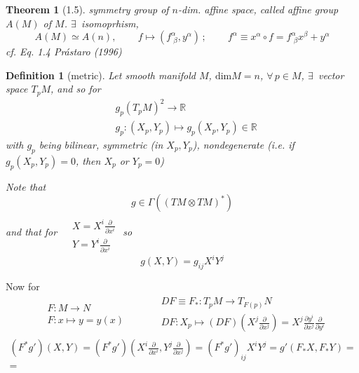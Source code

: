 \documentclass[10pt]{amsart}
\newtheorem{theorem}{Theorem}
\newtheorem{definition}{Definition}
\begin{document}
\begin{multicols*}{2}
\begin{theorem}[1.5] symmetry group of $n$-dim. affine space, called affine group $A(M)$ of $M$.  $\exists \, $ isomoprhism,
  \begin{equation}
    A(M) \simeq A(n), \qquad \, f\mapsto (f^{\alpha}_{ \, \, \beta} , y^{\alpha}) \, ; \qquad \, f^{\alpha} \equiv x^{\alpha} \circ f = f^{\alpha}_{ \, \, \beta} x^{\beta} + y^{\alpha}
  \end{equation}
cf. Eq. 1.4 Pr\'{a}staro (1996) \cite{Pras1996}
  \end{theorem}

\begin{definition}[metric]
	Let smooth manifold $M$, $\text{dim}M = n$, $\forall \, p \in M$, $\exists \, $ vector space $T_pM$, and so for 
	\begin{equation}
	\begin{aligned}
	& g_p (T_pM)^2 \to \mathbb{R} \\
	& g_p : (X_p,Y_p) \mapsto g_p(X_p,Y_p) \in \mathbb{R}
	\end{aligned}
	\end{equation}
	with $g_p$ being bilinear, symmetric (in $X_p,Y_p$), nondegenerate (i.e. if $g_p(X_p,Y_p)=0$, then $X_p$ or $Y_p=0$)
	
	Note that 
	\[
	g\in \Gamma((TM \otimes TM)^*)
	\]
	and that for $\begin{aligned} & \quad \\ 
	& X = X^i \frac{ \partial }{ \partial x^i } \\
	& Y = Y^i \frac{ \partial }{ \partial x^i } \end{aligned}$  
	so 	
	\[
	g(X,Y) = g_{ij} X^i Y^j
	\]  
	
\end{definition}

Now for 
\[
\begin{gathered}
\begin{aligned} 
& F: M \to N \\
& F: x \mapsto y = y(x) 
\end{aligned} \qquad \, \begin{aligned}
& DF \equiv F_* : T_p M \to T_{F(p)}N \\ 
&  DF : X_p \mapsto (DF) (X^j \frac{ \partial }{ \partial x^j }) = X^j \frac{\partial y^i}{\partial x^j} \frac{ \partial }{ \partial y^i}
\end{aligned}
\end{gathered}
\]
\[
\begin{gathered}
(F^* g')(X,Y) = (F^*g')(X^i \frac{ \partial }{ \partial x^i } , Y^j \frac{ \partial }{ \partial x^j} ) = (F^*g')_{ij} X^i Y^j = g'(F_*X, F_*Y) = \\
= 
\end{gathered}
\]






\end{multicols*}
\end{document}
